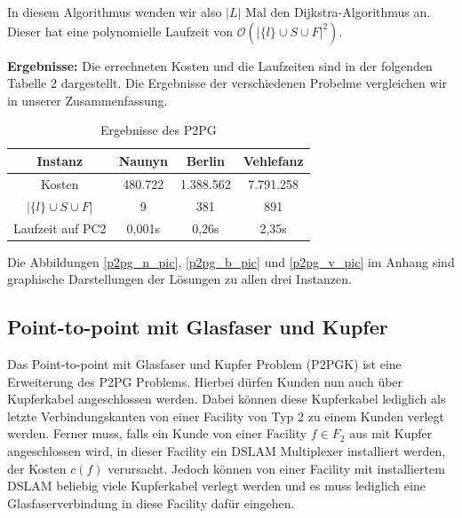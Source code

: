 \documentclass[11pt,a4paper]{article}
\theoremstyle{my_th_style1}
\begin{document}
In diesem Algorithmus wenden wir also $|L|$ Mal den Dijkstra-Algorithmus an.
Dieser hat eine polynomielle Laufzeit von \(\mathcal{O} ( {|\{l\} \cup S \cup F |}^2 )\).

\textbf{Ergebnisse:} Die errechneten Kosten und die Laufzeiten sind in der folgenden Tabelle 2 dargestellt.
Die Ergebnisse  der verschiedenen Probelme vergleichen wir in unserer Zusammenfassung.
\begin{table}[h]
	\centering
	\begin{tabular}{c|c|c|c}
		 Instanz & Naunyn & Berlin & Vehlefanz \\	
		\hline
		Kosten & 480.722 & 1.388.562 & 7.791.258 \\
		\( |\{l\} \cup S \cup F | \) & 9 & 381 & 891 \\
		Laufzeit auf PC2 & 0,001s & 0,26s & 2,35s\\
	\end{tabular}
	\label{P2PG}
	\caption{Ergebnisse des P2PG} 
\end{table}
Die Abbildungen \eqref{p2pg_n_pic}, \eqref{p2pg_b_pic} und \eqref{p2pg_v_pic} im Anhang sind graphische Darstellungen der L\"osungen zu allen drei Instanzen.



\subsection{Point-to-point mit Glasfaser und Kupfer}
Das Point-to-point mit Glasfaser und Kupfer Problem (P2PGK) ist eine Erweiterung des P2PG Problems.
Hierbei d\"urfen Kunden nun auch \"uber Kupferkabel angeschlossen werden.
Dabei k\"onnen diese Kupferkabel lediglich als letzte Verbindungskanten von einer Facility von Typ 2 zu einem Kunden verlegt werden.
Ferner muss, falls ein Kunde von einer Facility \(f \in F_2\) aus mit Kupfer angeschlossen wird, in dieser Facility ein DSLAM Multiplexer installiert werden, der Kosten \(c (f)\) verursacht.
Jedoch k\"onnen von einer Facility mit installiertem DSLAM beliebig viele Kupferkabel verlegt werden und es muss lediglich eine Glasfaserverbindung in diese Facility daf\"ur eingehen.
\end{document}
